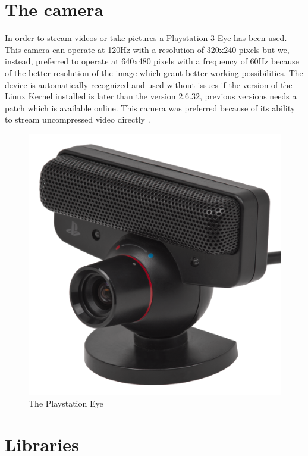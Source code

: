 \section{The camera}
In order to stream videos or take pictures a Playstation 3 Eye has been used.
This camera can operate at 120Hz with a resolution of 320x240 pixels but we, instead, preferred to operate at 640x480 pixels with a frequency of 60Hz because of the better resolution of the image which grant better working possibilities. The device is automatically recognized and used without issues if the version of the Linux Kernel installed is later than the version 2.6.32, previous versions needs a patch which is available online.
This camera was preferred because of its ability to stream uncompressed video directly \cite{pseyecompr}.

\begin{figure}[hbt]
    \vspace{2cm}
    \centering
    \includegraphics{img/pseye.png}
    \caption{The Playstation Eye}
\end{figure}
 
\newpage
\section{Libraries}

